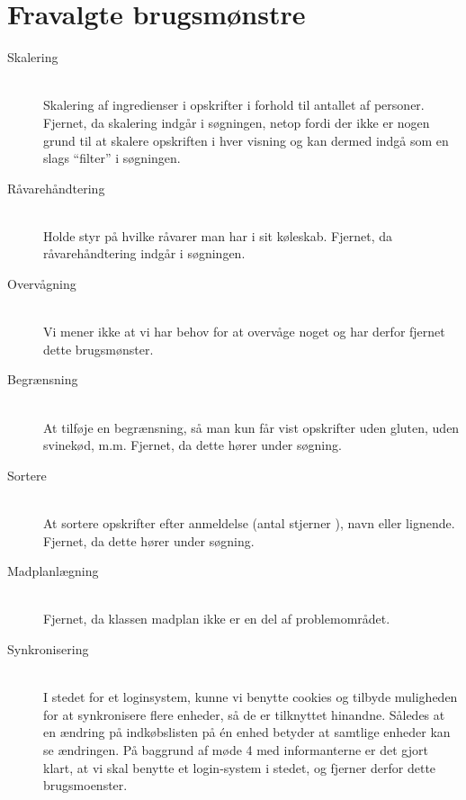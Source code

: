 \chapter{Fravalgte brugsmønstre}
\label{ap:fravalgtebrugsmoenstre}
\begin{description}
\item[Skalering] \hfill \\
Skalering af ingredienser i opskrifter i forhold til antallet af personer.
Fjernet, da skalering indgår i søgningen, netop fordi der ikke er nogen grund til at skalere opskriften i hver visning og kan dermed indgå som en slags “filter” i søgningen.

\item[Råvarehåndtering] \hfill \\
Holde styr på hvilke råvarer man har i sit køleskab.
Fjernet, da råvarehåndtering indgår i søgningen.

\item[Overvågning] \hfill \\
Vi mener ikke at vi har behov for at overvåge noget og har derfor fjernet dette brugsmønster.

\item[Begrænsning] \hfill \\
At tilføje en begrænsning, så man kun får vist opskrifter uden gluten, uden svinekød, m.m.
Fjernet, da dette hører under søgning.

\item[Sortere] \hfill \\
At sortere opskrifter efter anmeldelse (antal stjerner ), navn eller lignende.
Fjernet, da dette hører under søgning.

\item[Madplanlægning] \hfill \\
Fjernet, da klassen madplan ikke er en del af problemområdet.

\item[Synkronisering] \hfill \\
I stedet for et loginsystem, kunne vi benytte cookies og tilbyde muligheden for at synkronisere flere enheder, så de er tilknyttet hinandne. Således at en ændring på indkøbslisten på én enhed betyder at samtlige enheder kan se ændringen. På baggrund af møde 4 med informanterne er det gjort klart, at vi skal benytte et login-system i stedet, og fjerner derfor dette brugsmoenster.
\end{description}